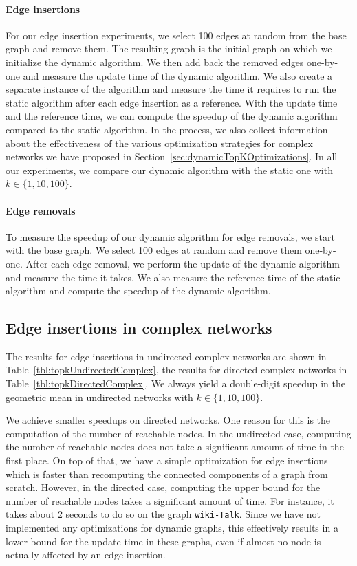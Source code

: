 \paragraph{Edge insertions}
For our edge insertion experiments, we select 100 edges at random from the base graph and remove them. The resulting graph is the initial graph on which we initialize the dynamic algorithm. We then add back the removed edges one-by-one and measure the update time of the dynamic algorithm. We also create a separate instance of the algorithm and measure the time it requires to run the static algorithm after each edge insertion as a reference. With the update time and the reference time, we can compute the speedup of the dynamic algorithm compared to the static algorithm. In the process, we also collect information about the effectiveness of the various optimization strategies for complex networks we have proposed in Section~\ref{sec:dynamicTopKOptimizations}. In all our experiments, we compare our dynamic algorithm with the static one with  $k \in \{1, 10, 100\}$.

\paragraph{Edge removals}
To measure the speedup of our dynamic algorithm for edge removals, we start with the base graph. We select 100 edges at random and remove them one-by-one. After each edge removal, we perform the update of the dynamic algorithm and measure the time it takes. We also measure the reference time of the static algorithm and compute the speedup of the dynamic algorithm.

\subsection{Edge insertions in complex networks}
The results for edge insertions in undirected complex networks are shown in Table~\ref{tbl:topkUndirectedComplex}, the results for directed complex networks in Table~\ref{tbl:topkDirectedComplex}. We always yield a double-digit speedup in the geometric mean in undirected networks with  $k \in \{1, 10, 100\}$.

We achieve smaller speedups on directed networks. One reason for this is the computation of the number of reachable nodes. In the undirected case, computing the number of reachable nodes does not take a significant amount of time in the first place. On top of that, we have a simple optimization for edge insertions which is faster than recomputing the connected components of a graph from scratch. However, in the directed case, computing the upper bound for the number of reachable nodes takes a significant amount of time. For instance, it takes about 2 seconds to do so on the graph \texttt{wiki-Talk}. Since we have not implemented any optimizations for dynamic graphs, this effectively results in a lower bound for the update time in these graphs, even if almost no node is actually affected by an edge insertion.

